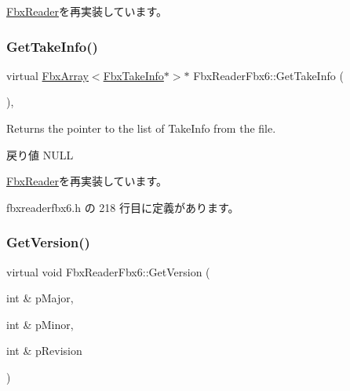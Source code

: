 \hyperlink{class_fbx_reader_ae14762357b4a8ecce10a266b06cc3117}{Fbx\+Reader}を再実装しています。

\mbox{\label{class_fbx_reader_fbx6_a6f90870b7572e7fcbc9832679a89d5f4}} 
\subsubsection{\texorpdfstring{Get\+Take\+Info()}{GetTakeInfo()}}
{\footnotesize\ttfamily virtual \hyperlink{class_fbx_array}{Fbx\+Array}$<$\hyperlink{class_fbx_take_info}{Fbx\+Take\+Info}$\ast$$>$$\ast$ Fbx\+Reader\+Fbx6\+::\+Get\+Take\+Info (\begin{DoxyParamCaption}{ }\end{DoxyParamCaption})\hspace{0.3cm}{\ttfamily [inline]}, {\ttfamily [virtual]}}

Returns the pointer to the list of Take\+Info from the file. \begin{DoxyReturn}{戻り値}
N\+U\+LL 
\end{DoxyReturn}


\hyperlink{class_fbx_reader_a9d7b40684bb3181219945eb0c73fb9d1}{Fbx\+Reader}を再実装しています。



 fbxreaderfbx6.\+h の 218 行目に定義があります。

\mbox{\label{class_fbx_reader_fbx6_aad4206439b88a858608710d745bfd8e8}} 
\subsubsection{\texorpdfstring{Get\+Version()}{GetVersion()}}
{\footnotesize\ttfamily virtual void Fbx\+Reader\+Fbx6\+::\+Get\+Version (\begin{DoxyParamCaption}\item[{int \&}]{p\+Major,  }\item[{int \&}]{p\+Minor,  }\item[{int \&}]{p\+Revision }\end{DoxyParamCaption})\hspace{0.3cm}{\ttfamily [virtual]}}

